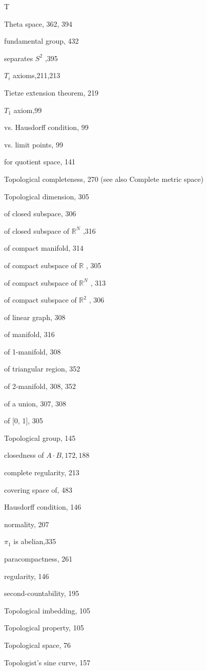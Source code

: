 T

Theta space, 362, 394

fundamental group, 432

separates \({S}^{2}\) ,395

\({T}_{i}\) axioms,211,213

Tietze extension theorem, 219

\({T}_{1}\) axiom,99

vs. Hausdorff condition, 99

vs. limit points, 99

for quotient space, 141

Topological completeness, 270 (see also Complete metric space)

Topological dimension, 305

of closed subspace, 306

of closed subspace of \({\mathbb{R}}^{N}\) ,316

of compact manifold, 314

of compact subspace of \(\mathbb{R}\) , 305

of compact subspace of \({\mathbb{R}}^{N}\) , 313

of compact subspace of \({\mathbb{R}}^{2}\) , 306

of linear graph, 308

of manifold, 316

of 1-manifold, 308

of triangular region, 352

of 2-manifold, 308, 352

of a union, 307, 308

of [0, 1], 305

Topological group, 145

closedness of \(A \cdot  B,{172},{188}\)

complete regularity, 213

covering space of, 483

Hausdorff condition, 146

normality, 207

\({\pi }_{1}\) is abelian,335

paracompactness, 261

regularity, 146

second-countability, 195

Topological imbedding, 105

Topological property, 105

Topological space, 76

Topologist's sine curve, 157

